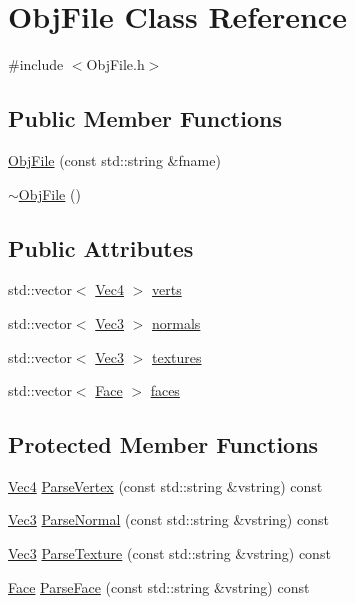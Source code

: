 \hypertarget{class_obj_file}{}\section{Obj\+File Class Reference}
\label{class_obj_file}


{\ttfamily \#include $<$Obj\+File.\+h$>$}

\subsection*{Public Member Functions}
\begin{DoxyCompactItemize}
\item 
\hyperlink{class_obj_file_a68cedd8d4a2dbb19e5a81f2177480f7f}{Obj\+File} (const std\+::string \&fname)
\item 
\hyperlink{class_obj_file_a2ff7d4c8b7feeb85703620a6346254c1}{$\sim$\+Obj\+File} ()
\end{DoxyCompactItemize}
\subsection*{Public Attributes}
\begin{DoxyCompactItemize}
\item 
std\+::vector$<$ \hyperlink{class_vec4}{Vec4} $>$ \hyperlink{class_obj_file_aac40796c7e8d9ee0d2af0311c0eca836}{verts}
\item 
std\+::vector$<$ \hyperlink{class_vec3}{Vec3} $>$ \hyperlink{class_obj_file_a122b557dc51b1d18dbd6f087c52325fc}{normals}
\item 
std\+::vector$<$ \hyperlink{class_vec3}{Vec3} $>$ \hyperlink{class_obj_file_aabfa30bb889d6e2bf08d54215c16d140}{textures}
\item 
std\+::vector$<$ \hyperlink{class_face}{Face} $>$ \hyperlink{class_obj_file_a52fd2bf6a3bc7bb0e6286bd6022cfc67}{faces}
\end{DoxyCompactItemize}
\subsection*{Protected Member Functions}
\begin{DoxyCompactItemize}
\item 
\hyperlink{class_vec4}{Vec4} \hyperlink{class_obj_file_a1b3f99e4baa0d9757207967506881488}{Parse\+Vertex} (const std\+::string \&vstring) const 
\item 
\hyperlink{class_vec3}{Vec3} \hyperlink{class_obj_file_a0e78fb9621961d7d29943c2dabc0c99b}{Parse\+Normal} (const std\+::string \&vstring) const 
\item 
\hyperlink{class_vec3}{Vec3} \hyperlink{class_obj_file_a11c56bb4d1bc70584ebedb414164242d}{Parse\+Texture} (const std\+::string \&vstring) const 
\item 
\hyperlink{class_face}{Face} \hyperlink{class_obj_file_a0a397fa02ef6b456f0d1ccd321b4226d}{Parse\+Face} (const std\+::string \&vstring) const 
\end{DoxyCompactItemize}
